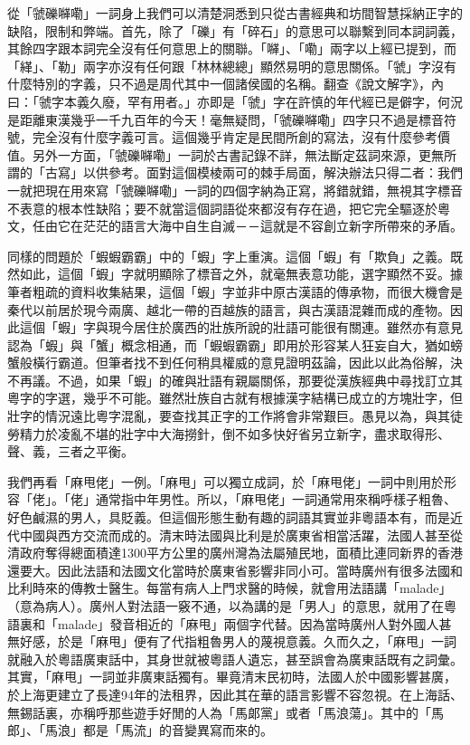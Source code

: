 從「虢礫𡃈嘞」一詞身上我們可以清楚洞悉到只從古書經典和坊間智慧採納正字的缺陷，限制和弊端。首先，除了「礫」有「碎石」的意思可以聯繫到同本詞詞義，其餘四字跟本詞完全沒有任何意思上的關聯。「𡃈」、「嘞」兩字以上經已提到，而「緙」、「勒」兩字亦沒有任何跟「林林總總」顯然易明的意思關係。「虢」字沒有什麼特別的字義，只不過是周代其中一個諸侯國的名稱。翻查《說文解字》，內曰：「虢字本義久廢，罕有用者。」亦即是「虢」字在許慎的年代經已是僻字，何況是距離東漢幾乎一千九百年的今天！毫無疑問，「虢礫𡃈嘞」四字只不過是標音符號，完全沒有什麼字義可言。這個幾乎肯定是民間所創的寫法，沒有什麼參考價值。另外一方面，「虢礫𡃈嘞」一詞於古書記錄不詳，無法斷定茲詞來源，更無所謂的「古寫」以供參考。面對這個模棱兩可的棘手局面，解決辦法只得二者：我們一就把現在用來寫「虢礫𡃈嘞」一詞的四個字納為正寫，將錯就錯，無視其字標音不表意的根本性缺陷；要不就當這個詞語從來都沒有存在過，把它完全驅逐於粵文，任由它在茫茫的語言大海中自生自滅－－這就是不容創立新字所帶來的矛盾。

同樣的問題於「蝦蝦霸霸」中的「蝦」字上重演。這個「蝦」有「欺負」之義。既然如此，這個「蝦」字就明顯除了標音之外，就毫無表意功能，選字顯然不妥。據筆者粗疏的資料收集結果，這個「蝦」字並非中原古漢語的傳承物，而很大機會是秦代以前居於現今兩廣、越北一帶的百越族的語言，與古漢語混雜而成的產物。因此這個「蝦」字與現今居住於廣西的壯族所說的壯語可能很有關連。雖然亦有意見認為「蝦」與「蟹」概念相通，而「蝦蝦霸霸」即用於形容某人狂妄自大，猶如螃蟹般橫行霸道。但筆者找不到任何稍具權威的意見證明茲論，因此以此為俗解，決不再議。不過，如果「蝦」的確與壯語有親屬關係，那要從漢族經典中尋找訂立其粵字的字選，幾乎不可能。雖然壯族自古就有根據漢字結構已成立的方塊壯字，但壯字的情況遠比粵字混亂，要查找其正字的工作將會非常艱巨。愚見以為，與其徒勞精力於凌亂不堪的壯字中大海撈針，倒不如多快好省另立新字，盡求取得形、聲、義，三者之平衡。

我們再看「麻甩佬」一例。「麻甩」可以獨立成詞，於「麻甩佬」一詞中則用於形容「佬」。「佬」通常指中年男性。所以，「麻甩佬」一詞通常用來稱呼樣子粗魯、好色鹹濕的男人，具貶義。但這個形態生動有趣的詞語其實並非粵語本有，而是近代中國與西方交流而成的。清末時法國與比利是於廣東省相當活躍，法國人甚至從清政府奪得總面積達1300平方公里的廣州灣為法屬殖民地，面積比連同新界的香港還要大。因此法語和法國文化當時於廣東省影響非同小可。當時廣州有很多法國和比利時來的傳教士醫生。每當有病人上門求醫的時候，就會用法語講「malade」（意為病人）。廣州人對法語一竅不通，以為講的是「男人」的意思，就用了在粵語裏和「malade」發音相近的「麻甩」兩個字代替。因為當時廣州人對外國人甚無好感，於是「麻甩」便有了代指粗魯男人的蔑視意義。久而久之，「麻甩」一詞就融入於粵語廣東話中，其身世就被粵語人遺忘，甚至誤會為廣東話既有之詞彙。其實，「麻甩」一詞並非廣東話獨有。畢竟清末民初時，法國人於中國影響甚廣，於上海更建立了長達94年的法租界，因此其在華的語言影響不容忽視。在上海話、無錫話裏，亦稱呼那些遊手好閒的人為「馬郞黨」或者「馬浪蕩」。其中的「馬郎」、「馬浪」都是「馬流」的音變異寫而來的。


